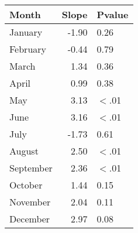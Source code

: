 \documentclass{article}\usepackage[]{graphicx}\usepackage[]{color}
\begin{document}
\begin{table}[ht]
\centering
\begin{tabular}{lrl}
  \hline
Month & Slope & Pvalue \\ 
  \hline
January & -1.90 & 0.26 \\ 
  February & -0.44 & 0.79 \\ 
  March & 1.34 & 0.36 \\ 
  April & 0.99 & 0.38 \\ 
  May & 3.13 & $<$.01 \\ 
  June & 3.16 & $<$.01 \\ 
  July & -1.73 & 0.61 \\ 
  August & 2.50 & $<$.01 \\ 
  September & 2.36 & $<$.01 \\ 
  October & 1.44 & 0.15 \\ 
  November & 2.04 & 0.11 \\ 
  December & 2.97 & 0.08 \\ 
   \hline
\end{tabular}
\end{table}
\end{document}
